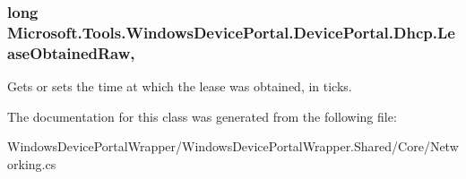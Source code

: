 \subsubsection[{\texorpdfstring{Lease\+Obtained\+Raw}{LeaseObtainedRaw}}]{\setlength{\rightskip}{0pt plus 5cm}long Microsoft.\+Tools.\+Windows\+Device\+Portal.\+Device\+Portal.\+Dhcp.\+Lease\+Obtained\+Raw\hspace{0.3cm}{\ttfamily [get]}, {\ttfamily [set]}}\hypertarget{class_microsoft_1_1_tools_1_1_windows_device_portal_1_1_device_portal_1_1_dhcp_ab3fec7067df816e3d7fc7d2a2023e0d9}{}\label{class_microsoft_1_1_tools_1_1_windows_device_portal_1_1_device_portal_1_1_dhcp_ab3fec7067df816e3d7fc7d2a2023e0d9}


Gets or sets the time at which the lease was obtained, in ticks. 



The documentation for this class was generated from the following file\+:\begin{DoxyCompactItemize}
\item 
Windows\+Device\+Portal\+Wrapper/\+Windows\+Device\+Portal\+Wrapper.\+Shared/\+Core/Networking.\+cs\end{DoxyCompactItemize}
